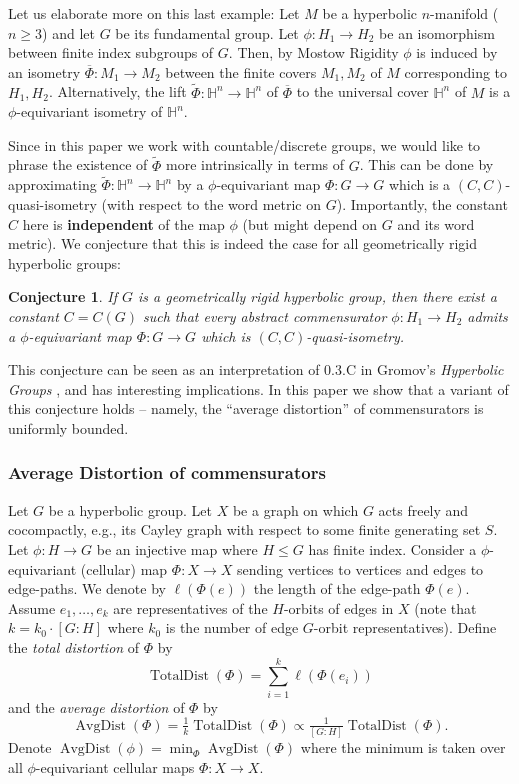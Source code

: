 \documentclass{amsart}
\numberwithin{equation}{section}
\newtheorem{conjecture}[theorem]{Conjecture}
\theoremstyle{definition}
\newcommand{\bbH}{\mathbb{H}}
\newcommand{\tild}[1]{\widetilde{#1}}
\DeclareMathOperator{\AD}{AvgDist}
\DeclareMathOperator{\TD}{TotalDist}
\begin{document}
Let us elaborate more on this last example:
Let $M$ be a hyperbolic $n$-manifold ($n\ge 3$) and let $G$ be its fundamental group. 
Let $\phi:H_1\to H_2$ be an isomorphism between finite index subgroups of $G$. 
Then, by Mostow Rigidity \cite{mostow1968quasi} $\phi$ is induced by an isometry $\overline \Phi:M_1\to M_2$ between the finite covers $M_1,M_2$ of $M$ corresponding to $H_1,H_2$.
Alternatively, the lift $\tild \Phi:\bbH^n \to \bbH^n$ of $\overline \Phi$ to the universal cover $\bbH^n$ of $M$ is a $\phi$-equivariant isometry of $\bbH^n$.

Since in this paper we work with countable/discrete groups, we would like to phrase the existence of $\tild \Phi$ more intrinsically in terms of $G$. 
This can be done by approximating $\tild \Phi : \bbH^n \to \bbH^n$ by a $\phi$-equivariant map $\Phi: G\to G$ which is a $(C,C)$-quasi-isometry (with respect to the word metric on $G$).
Importantly, the constant $C$ here is \textbf{independent} of the map $\phi$ (but might depend on  $G$ and its word metric).
We conjecture that this is indeed the case for all geometrically rigid hyperbolic groups:

\begin{conjecture}
If $G$ is a geometrically rigid hyperbolic group, then there exist a constant $C=C(G)$ such that every abstract commensurator $\phi:H_1\to H_2$ admits a $\phi$-equivariant map $\Phi:G\to G$ which is $(C,C)$-quasi-isometry.
\end{conjecture}

This conjecture can be seen as an interpretation of 0.3.C in Gromov's \emph{Hyperbolic Groups} \cite{gromov1987hyperbolic}, and has interesting implications.
In this paper we show that a variant of this conjecture holds -- namely, the ``average distortion'' of commensurators is uniformly bounded.

\subsubsection*{Average Distortion of commensurators}
Let $G$ be a hyperbolic group.
Let $X$ be a graph on which $G$ acts freely and cocompactly, e.g., its Cayley graph with respect to some finite generating set $S$. 
Let $\phi:H\to G$ be an injective map where $H\le G$ has finite index. Consider a $\phi$-equivariant (cellular) map $\Phi:X\to X$ sending vertices to vertices and edges to edge-paths.
We denote by $\ell(\Phi(e))$ the length of the edge-path $\Phi(e)$.
Assume $e_1,\dots,e_k$ are representatives of the $H$-orbits of edges in $X$ (note that $k = k_0\cdot [G:H]$ where $k_0$ is the number of edge $G$-orbit representatives).
Define the \emph{total distortion} of $\Phi$ by $$\TD(\Phi) = \sum_{i=1}^k \ell(\Phi(e_i))$$ and the \emph{average distortion} of $\Phi$ by $$ \AD(\Phi) = \tfrac 1{k}\TD(\Phi)  \propto \tfrac 1{[G:H]}\TD(\Phi).$$
Denote $\AD(\phi) = \min_\Phi \AD(\Phi)$ where the minimum is taken over all $\phi$-equivariant cellular maps $\Phi:X\to X$.
\end{document}
